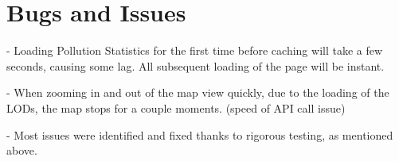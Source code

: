 \section{Bugs and Issues}

    - Loading Pollution Statistics for the first time before caching will take a few seconds, causing some lag. All subsequent loading of the page will be instant.
    
    - When zooming in and out of the map view quickly, due to the loading of the LODs, the map stops for a couple moments. (speed of API call issue)
    
    - Most issues were identified and fixed thanks to rigorous testing, as mentioned above.
